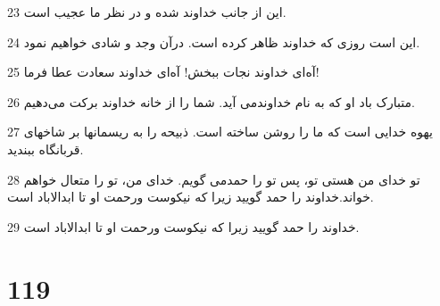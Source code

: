 \par 23 این از جانب خداوند شده و در نظر ما عجیب است.
\par 24 این است روزی که خداوند ظاهر کرده است. درآن وجد و شادی خواهیم نمود.
\par 25 آه‌ای خداوند نجات ببخش! آه‌ای خداوند سعادت عطا فرما!
\par 26 متبارک باد او که به نام خداوندمی آید. شما را از خانه خداوند برکت می‌دهیم.
\par 27 یهوه خدایی است که ما را روشن ساخته است. ذبیحه را به ریسمانها بر شاخهای قربانگاه ببندید.
\par 28 تو خدای من هستی تو، پس تو را حمدمی گویم. خدای من، تو را متعال خواهم خواند.خداوند را حمد گویید زیرا که نیکوست ورحمت او تا ابدالاباد است.
\par 29 خداوند را حمد گویید زیرا که نیکوست ورحمت او تا ابدالاباد است.
 
\chapter{119}

